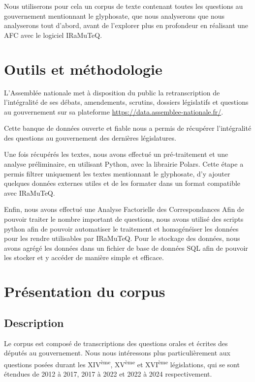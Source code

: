 \documentclass[12pt,twocolumn,landscape]{article}
\begin{document}
    Nous utiliserons pour cela un corpus
    de texte contenant toutes les questions au gouvernement
    mentionnant le glyphosate,
    que nous analyserons que nous analyserons tout d'abord,
    avant de l'explorer plus en profondeur en réalisant une AFC
    avec le logiciel IRaMuTeQ\@.


    \section{Outils et méthodologie}\label{sec:outils-et-methodologie}

    L'Assemblée nationale met à disposition du public la retranscription
    de l'intégralité de ses débats, amendements, scrutins, dossiers
    législatifs et questions au gouvernement
    sur sa plateforme \url{https://data.assemblee-nationale.fr/}\cite{archive-assemblee-nationale}.

    Cette banque de données ouverte et fiable
    nous a permis de récupérer l'intégralité des questions
    au gouvernement des dernières législatures.

    Une fois récupérés les textes, nous avons effectué
    un pré-traitement et une analyse préliminaire,
    en utilisant Python, avec la librairie Polars.
    Cette étape a permis filtrer uniquement les textes
    mentionnant le glyphosate, d'y ajouter quelques données externes
    utiles et de les formater dans un format compatible avec IRaMuTeQ\@.

    Enfin, nous avons effectué une Analyse Factorielle des Correspondances
    Afin de pouvoir traiter le nombre important de questions,
    nous avons utilisé des scripts python afin de pouvoir automatiser
    le traitement et homogénéiser les données pour les rendre utilisables par IRaMuTeQ\@.
    Pour le stockage des données, nous avons agrégé les données
    dans un fichier de base de données SQL afin de pouvoir les stocker
    et y accéder de manière simple et efficace.


    \section{Présentation du corpus}\label{sec:presentation-du-corpus}

    \subsection{Description}\label{subsec:description}

    Le corpus est composé de transcriptions des questions orales et écrites
    des députés au gouvernement.
    Nous nous intéressons plus particulièrement aux questions
    posées durant les XIV\textsuperscript{ème}, XV\textsuperscript{ème}
    et XVI\textsuperscript{ème} législations,
    qui se sont étendues de 2012 à 2017, 2017 à 2022 et 2022 à 2024 respectivement.
\end{document}
